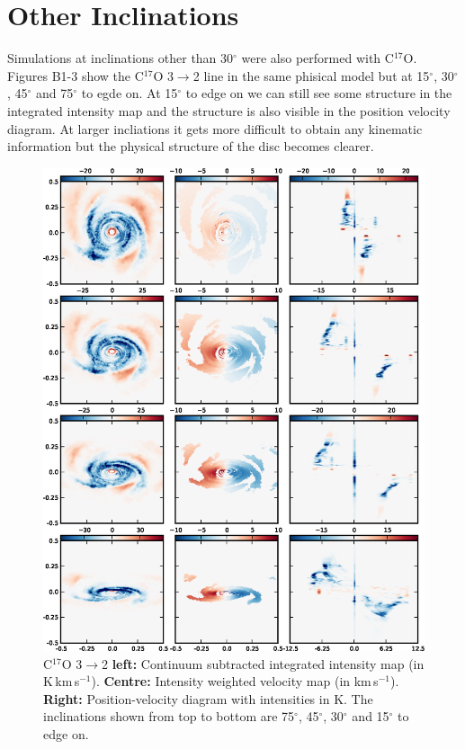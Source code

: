\documentclass[useAMS,usenatbib]{mn2e}
\begin{document}
\section{Other Inclinations} \label{sec:other_inc}

Simulations at inclinations other than 30$^\circ$ were also performed with C$^{17}$O. Figures B1-3 show the C$^{17}$O 3$\rightarrow$2 line in the same phisical model but at 15$^\circ$, 30$^\circ$, 45$^\circ$ and 75$^\circ$ to egde on. At 15$^\circ$ to edge on we can still see some structure in the integrated intensity map and the structure is also visible in the position velocity diagram. At larger incliations it gets more difficult to obtain any kinematic information but the physical structure of the disc becomes clearer.

\begin{figure}
 \includegraphics[width=164mm]{Figures/sim/appendix_inclinations2.eps}

 \caption{C$^{17}$O 3$\rightarrow$2 {\bf left:} Continuum subtracted integrated intensity map (in K$\,$km$\,$s$^{-1}$). {\bf Centre:} Intensity weighted velocity map (in km$\,$s$^{-1}$). {\bf Right:} Position-velocity diagram with intensities in K. The inclinations shown from top to bottom are 75$^\circ$, 45$^\circ$, 30$^\circ$ and 15$^\circ$ to edge on.}
\end{figure}
\end{document}
